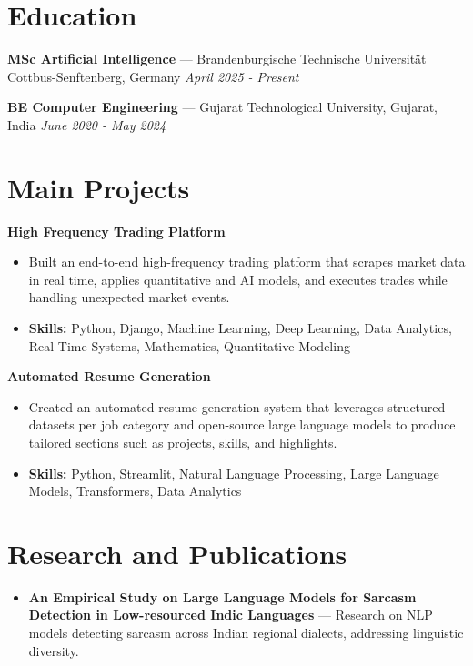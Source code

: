 \documentclass[a4paper,10pt]{article}
\begin{document}
\section*{Education}
\textbf{MSc Artificial Intelligence} — Brandenburgische Technische Universität Cottbus-Senftenberg, Germany \hfill \textit{April 2025 - Present}\par
\vspace{1.5pt}
\textbf{BE Computer Engineering} — Gujarat Technological University, Gujarat, India \hfill \textit{June 2020 - May 2024}\par

\section*{Main Projects}
\textbf{High Frequency Trading Platform}\par
\vspace{1pt}
\begin{itemize}
  \item Built an end-to-end high-frequency trading platform that scrapes market data in real time, applies quantitative and AI models, and executes trades while handling unexpected market events.
  \item \textbf{Skills:} Python, Django, Machine Learning, Deep Learning, Data Analytics, Real-Time Systems, Mathematics, Quantitative Modeling
\end{itemize}
\vspace{3pt}
\textbf{Automated Resume Generation}\par
\vspace{1pt}
\begin{itemize}
  \item Created an automated resume generation system that leverages structured datasets per job category and open-source large language models to produce tailored sections such as projects, skills, and highlights.
  \item \textbf{Skills:} Python, Streamlit, Natural Language Processing, Large Language Models, Transformers, Data Analytics
\end{itemize}

\section*{Research and Publications}
\begin{itemize}
\item \textbf{An Empirical Study on Large Language Models for Sarcasm Detection in Low-resourced Indic Languages} — Research on NLP models detecting sarcasm across Indian regional dialects, addressing linguistic diversity.
\end{itemize}
\end{document}
